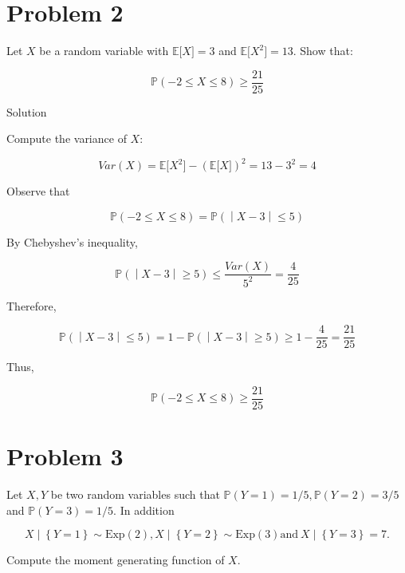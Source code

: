 \section{Problem 2}\label{hw04-problem-2}

Let \(\mathit{X}\) be a random variable with \(\mathbb{E}\lbrack\mathit{X}\rbrack = 3\) and \(\mathbb{E}\lbrack\mathit{X}^{2}\rbrack = 13\). Show that:

\[\mathbb{P}( - 2 \leq \mathit{X} \leq 8) \geq \frac{21}{25}\]

\begin{qlsolution}{Solution}

Compute the variance of \(\mathit{X}\):

\[Var(\mathit{X}) = \mathbb{E}\lbrack\mathit{X}^{2}\rbrack - (\mathbb{E}\lbrack\mathit{X}\rbrack)^{2} = 13 - 3^{2} = 4\]

Observe that

\[\left. \mathbb{P}( - 2 \leq \mathit{X} \leq 8) = \mathbb{P}( \middle| \mathit{X} - 3 \middle| \leq 5) \right.\]

By Chebyshev's inequality,

\[\left. \mathbb{P}( \middle| \mathit{X} - 3 \middle| \geq 5) \leq \frac{Var(\mathit{X})}{5^{2}} = \frac{4}{25} \right.\]

Therefore,

\[\left. \mathbb{P}( \middle| \mathit{X} - 3 \middle| \leq 5) = 1 - \mathbb{P}( \middle| \mathit{X} - 3 \middle| \geq 5) \geq 1 - \frac{4}{25} = \frac{21}{25} \right.\]

Thus,

\[\mathbb{P}( - 2 \leq \mathit{X} \leq 8) \geq \frac{21}{25}\]

\end{qlsolution}

\section{Problem 3}\label{hw04-problem-3}

Let \(\mathit{X},\mathit{Y}\) be two random variables such that \(\mathbb{P}(\mathit{Y} = 1) = 1/5,\mathbb{P}(\mathit{Y} = 2) = 3/5\) and \(\mathbb{P}(\mathit{Y} = 3) = 1/5\). In addition

\[\left. \mathit{X} \middle| \left\{ {\mathit{Y} = 1} \right\} \sim \text{Exp}(2),\mathit{X} \middle| \left\{ {\mathit{Y} = 2} \right\} \sim \text{Exp}(3)\text{and}\ \mathit{X} \mid \left\{ {\mathit{Y} = 3} \right\} = 7. \right.\]

Compute the moment generating function of \(\mathit{X}\).

